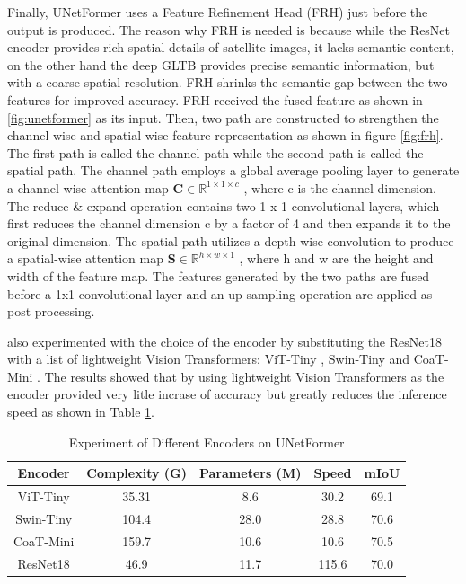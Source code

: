 Finally, UNetFormer uses a Feature Refinement Head (FRH) just before the output is produced. The reason why FRH is needed is because while the ResNet encoder provides rich spatial details of satellite images, it lacks semantic content, on the other hand the deep GLTB provides precise semantic information, but with a coarse spatial resolution. FRH shrinks the semantic gap between the two features for improved accuracy. FRH received the fused feature as shown in \ref{fig:unetformer} as its input. Then, two path are constructed to strengthen the channel-wise and spatial-wise feature representation as shown in figure \ref{fig:frh}. The first path is called the channel path while the second path is called the spatial path. The channel path employs a global average pooling layer to generate a channel-wise attention map $\textbf{C} \in \mathbb{R}^{1\times 1 \times c}$ , where c is the channel dimension. The reduce \& expand operation contains two 1 x 1 convolutional layers, which first reduces the channel dimension c by a factor of 4 and then expands it to the original dimension. The spatial path utilizes a depth-wise convolution to produce a spatial-wise attention map $\textbf{S} \in \mathbb{R}^{h\times w \times 1}$  , where h and w are the height and width of the feature map. The features generated by the two paths are fused before a 1x1 convolutional layer and an up sampling operation are applied as post processing.

 also experimented with the choice of the encoder by substituting the ResNet18 with a list of lightweight Vision Transformers: ViT-Tiny \cite{16x16}, Swin-Tiny \cite{swin-v1} and CoaT-Mini \cite{coat}. The results showed that by using lightweight Vision Transformers as the encoder provided very litle incrase of accuracy but  greatly reduces the inference speed as shown in Table \ref{tab:unetformer-exp}. 

\FloatBarrier
\begin{table}[]
\centering
\begin{tabular}{|c|c|c|c|c|}
\hline
\textbf{Encoder} & \textbf{Complexity (G)} & \textbf{Parameters (M)} & \multicolumn{1}{l|}{\textbf{Speed}} & \multicolumn{1}{l|}{\textbf{mIoU}} \\ \hline
ViT-Tiny         & 35.31                   & 8.6                     & 30.2                                & 69.1                               \\ \hline
Swin-Tiny        & 104.4                   & 28.0                    & 28.8                                & 70.6                               \\ \hline
CoaT-Mini        & 159.7                   & 10.6                    & 10.6                                & 70.5                               \\ \hline
ResNet18         & 46.9                    & 11.7                    & 115.6                               & 70.0                               \\ \hline
\end{tabular}
\label{tab:unetformer-exp}
\caption {Experiment of Different Encoders on UNetFormer}
\end{table}
\FloatBarrier

